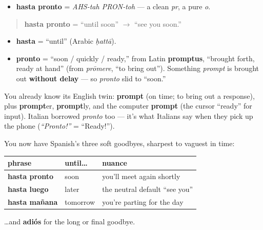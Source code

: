 \begin{sounds}
\begin{itemize}
\raggedright
  \item \textbf{hasta pronto} = \emph{AHS-tah PRON-toh} — a clean \emph{pr}, a pure \emph{o}.
\end{itemize}
\end{sounds}

\begin{cousinweb}
\begin{quote}
\textbf{hasta pronto} = \textquotedblleft{}until soon\textquotedblright{} $\to$ \textquotedblleft{}see you soon.\textquotedblright{}
\end{quote}

\begin{itemize}
\raggedright
  \item \textbf{hasta} = \textquotedblleft{}until\textquotedblright{} (Arabic \emph{ḥattā}).
  \item \textbf{pronto} = \textquotedblleft{}soon / quickly / ready,\textquotedblright{} from Latin \textbf{promptus}, \textquotedblleft{}brought forth, ready at hand\textquotedblright{} (from \emph{prōmere}, \textquotedblleft{}to bring out\textquotedblright{}). Something \emph{prompt} is brought out \textbf{without delay} — so \emph{pronto} slid to \textquotedblleft{}soon.\textquotedblright{}
\end{itemize}

You already know its English twin: \textbf{prompt} (on time; to bring out a response), plus \textbf{prompt}er, \textbf{prompt}ly, and the computer \textbf{prompt} (the cursor \textquotedblleft{}ready\textquotedblright{} for input). Italian borrowed \emph{pronto} too — it's what Italians say when they pick up the phone (\emph{\textquotedblleft{}Pronto!\textquotedblright{}} = \textquotedblleft{}Ready!\textquotedblright{}).
\end{cousinweb}

\begin{grammarlens}[title={Grammar Lens: the \textquotedblleft{}hasta …\textquotedblright{} trio, complete}]
You now have Spanish's three soft goodbyes, sharpest to vaguest in time:

\noindent
\begin{tabularx}{\linewidth}{@{}>{\raggedright\arraybackslash}X>{\raggedright\arraybackslash}X>{\raggedright\arraybackslash}X@{}}
\toprule
\textbf{phrase} & \textbf{until…} & \textbf{nuance} \\
\midrule
\textbf{hasta pronto} & soon & you'll meet again shortly \\
\textbf{hasta luego} & later & the neutral default \textquotedblleft{}see you\textquotedblright{} \\
\textbf{hasta mañana} & tomorrow & you're parting for the day \\
\bottomrule
\end{tabularx}

…and \textbf{adiós} for the long or final goodbye.
\end{grammarlens}

